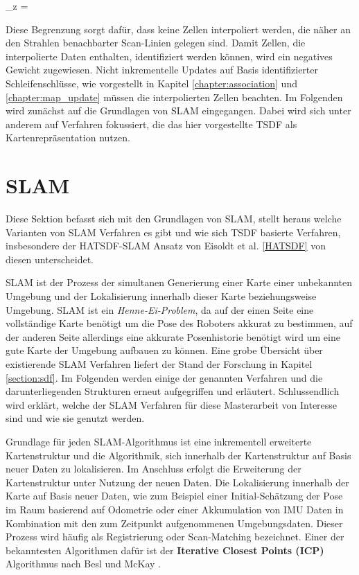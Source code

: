 \begin{myequation}
\Delta_z = 
\end{myequation}

Diese Begrenzung sorgt dafür, dass keine Zellen interpoliert werden, die näher an den Strahlen benachbarter Scan-Linien gelegen sind. Damit Zellen, die interpolierte Daten enthalten, identifiziert werden können, wird ein negatives Gewicht zugewiesen. Nicht inkrementelle Updates auf Basis identifizierter Schleifenschlüsse, wie vorgestellt in Kapitel \ref{chapter:association} und \ref{chapter:map_update} müssen die interpolierten Zellen beachten. Im Folgenden wird zunächst auf die Grundlagen von SLAM eingegangen. Dabei wird sich unter anderem auf Verfahren fokussiert, die das hier vorgestellte TSDF als Kartenrepräsentation nutzen.

\section{SLAM}
\label{section:slam}

Diese Sektion befasst sich mit den Grundlagen von SLAM, stellt heraus welche Varianten von SLAM Verfahren es gibt und wie sich TSDF basierte Verfahren, insbesondere der HATSDF-SLAM Ansatz von Eisoldt et al. \ref{HATSDF} von diesen unterscheidet.

SLAM ist der Prozess der simultanen Generierung einer Karte einer unbekannten Umgebung und der Lokalisierung innerhalb dieser Karte beziehungsweise Umgebung. SLAM ist ein \emph{Henne-Ei-Problem}, da auf der einen Seite eine vollständige Karte benötigt um die Pose des Roboters akkurat zu bestimmen, auf der anderen Seite allerdings eine akkurate Posenhistorie benötigt wird um eine gute Karte der Umgebung aufbauen zu können. Eine grobe Übersicht über existierende SLAM Verfahren liefert der Stand der Forschung in Kapitel \ref{section:sdf}. Im Folgenden werden einige der genannten Verfahren und die darunterliegenden Strukturen erneut aufgegriffen und erläutert.
Schlussendlich wird erklärt, welche der SLAM Verfahren für diese Masterarbeit von Interesse sind und wie sie genutzt werden.

Grundlage für jeden SLAM-Algorithmus ist eine inkrementell erweiterte Kartenstruktur und die Algorithmik, sich innerhalb der Kartenstruktur auf Basis neuer Daten zu lokalisieren. Im Anschluss erfolgt die Erweiterung der Kartenstruktur unter Nutzung der neuen Daten. Die Lokalisierung innerhalb der Karte auf Basis neuer Daten, wie zum Beispiel einer Initial-Schätzung der Pose im Raum basierend auf Odometrie oder einer Akkumulation von IMU Daten in Kombination mit den zum Zeitpunkt aufgenommenen Umgebungsdaten. Dieser Prozess wird häufig als Registrierung oder Scan-Matching bezeichnet. Einer der bekanntesten Algorithmen dafür ist der \textbf{Iterative Closest Points (ICP)} Algorithmus nach Besl und McKay \cite{Besl:1992}.

